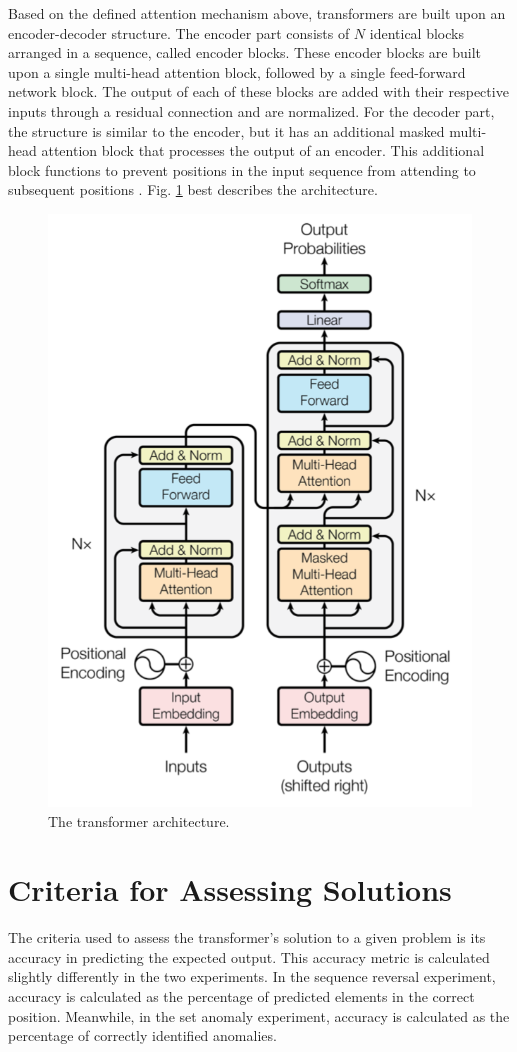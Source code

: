 \documentclass[peerreview]{IEEEtran}
\begin{document}
Based on the defined attention mechanism above, transformers are built upon an encoder-decoder structure. The encoder part consists of $N$ identical blocks arranged in a sequence, called encoder blocks. These encoder blocks are built upon a single multi-head attention block, followed by a single feed-forward network block. The output of each of these blocks are added with their respective inputs through a residual connection and are normalized. For the decoder part, the structure is similar to the encoder, but it has an additional masked multi-head attention block that processes the output of an encoder. This additional block functions to prevent positions in the input sequence from attending to subsequent positions \cite{vaswani_2017}. Fig. \ref{fig_transformer} best describes the architecture.
\begin{figure}[!h]
\centering
\includegraphics[width=0.8\columnwidth]{transformer} 
\caption{The transformer architecture.}
\label{fig_transformer}
\end{figure}

\section{Criteria for Assessing Solutions} \label{sec:criteria}
The criteria used to assess the transformer's solution to a given problem is its accuracy in predicting the expected output. This accuracy metric is calculated slightly differently in the two experiments. In the sequence reversal experiment, accuracy is calculated as the percentage of predicted elements in the correct position. Meanwhile, in the set anomaly experiment, accuracy is calculated as the percentage of correctly identified anomalies. 
\end{document}
